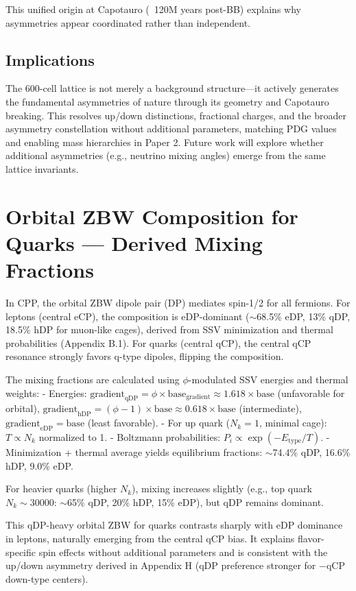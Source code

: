 \documentclass{article}
\begin{document}
This unified origin at Capotauro (~120M years post-BB) explains why asymmetries appear coordinated rather than independent.

\subsection{Implications}

The 600-cell lattice is not merely a background structure—it actively generates the fundamental asymmetries of nature through its geometry and Capotauro breaking. This resolves up/down distinctions, fractional charges, and the broader asymmetry constellation without additional parameters, matching PDG values \cite{pdg2024} and enabling mass hierarchies in Paper 2. Future work will explore whether additional asymmetries (e.g., neutrino mixing angles) emerge from the same lattice invariants.

\section{Orbital ZBW Composition for Quarks — Derived Mixing Fractions}

In CPP, the orbital ZBW dipole pair (DP) mediates spin-1/2 for all fermions. For leptons (central eCP), the composition is eDP-dominant ($\sim$68.5\% eDP, 13\% qDP, 18.5\% hDP for muon-like cages), derived from SSV minimization and thermal probabilities (Appendix B.1). For quarks (central qCP), the central qCP resonance strongly favors q-type dipoles, flipping the composition.

The mixing fractions are calculated using $\phi$-modulated SSV energies and thermal weights:
- Energies: $\text{gradient}_{\text{qDP}} = \phi \times \text{base}_{\text{gradient}} \approx 1.618 \times \text{base}$ (unfavorable for orbital), $\text{gradient}_{\text{hDP}} = (\phi-1) \times \text{base} \approx 0.618 \times \text{base}$ (intermediate), $\text{gradient}_{\text{eDP}} = \text{base}$ (least favorable).
- For up quark ($N_k=1$, minimal cage): $T \propto N_k$ normalized to 1.
- Boltzmann probabilities: $P_i \propto \exp(-E_{\text{type}} / T)$.
- Minimization + thermal average yields equilibrium fractions: $\sim$74.4\% qDP, 16.6\% hDP, 9.0\% eDP.

For heavier quarks (higher $N_k$), mixing increases slightly (e.g., top quark $N_k \sim 30000$: $\sim$65\% qDP, 20\% hDP, 15\% eDP), but qDP remains dominant.

This qDP-heavy orbital ZBW for quarks contrasts sharply with eDP dominance in leptons, naturally emerging from the central qCP bias. It explains flavor-specific spin effects without additional parameters and is consistent with the up/down asymmetry derived in Appendix H (qDP preference stronger for $-$qCP down-type centers). 
\end{document}
